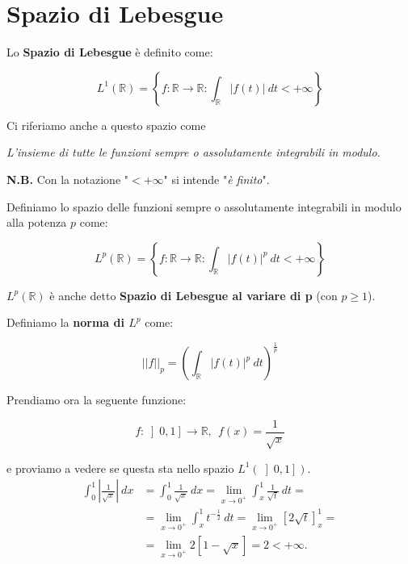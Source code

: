 \section{Spazio di Lebesgue}

\begin{definition}
    Lo \textbf{Spazio di Lebesgue} è definito come:
    
    $$
        L^1(\mathbb{R}) = \left \{ f: \mathbb{R} \rightarrow \mathbb{R} : \int_\mathbb{R} |f(t)| \ dt < +\infty \right \}
    $$
\end{definition}

Ci riferiamo anche a questo spazio come
\begin{center}
    \textit{L'insieme di tutte le funzioni sempre o assolutamente integrabili in
        modulo}.
\end{center}

\textbf{N.B.} Con la notazione "$< +\infty$" si intende "\textit{è finito}".

\begin{definition}
    Definiamo lo spazio delle funzioni sempre o assolutamente integrabili in
    modulo alla potenza $p$ come:
    
    $$
        L^p(\mathbb{R}) = \left \{ f: \mathbb{R} \rightarrow \mathbb{R} : \int_\mathbb{R} |f(t)|^p \ dt < +\infty \right \}
    $$
    
    $L^p (\mathbb{R})$ è anche detto \textbf{Spazio di Lebesgue al variare di p}
    (con $p \ge 1$).
\end{definition}

\begin{definition}
    Definiamo la \textbf{norma di $L^p$} come:
    
    $$
        ||f||_p = \left( \int_{\mathbb{R}} |f(t)|^p \ dt \right)^{\frac{1}{p}}
    $$
\end{definition}

Prendiamo ora la seguente funzione:

$$
    f : \left] 0, 1 \right] \rightarrow \mathbb{R}, \ \ f(x) = \frac{1}{\sqrt{x}}
$$

e proviamo a vedere se questa sta nello spazio $L^1(\left] 0, 1 \right])$.
\begin{equation}
    \begin{aligned}
        \int_{0}^{1} |\frac{1}{\sqrt{x}}| \ dx & = \int_{0}^{1} \frac{1}{\sqrt{x}} \ dx = \lim_{x \rightarrow 0^+} \int_{x}^{1} \frac{1}{\sqrt{t}} \ dt =          \\
                                               & = \lim_{x \rightarrow 0^+} \int_{x}^{1} t^{-\frac{1}{2}} \ dt = \lim_{x \rightarrow 0^+} [ 2 \sqrt{t} ]_{x}^{1} = \\
                                               & = \lim_{x \rightarrow 0^+} 2 [1 - \sqrt{x}] = 2 < +\infty.
    \end{aligned}
\end{equation}

